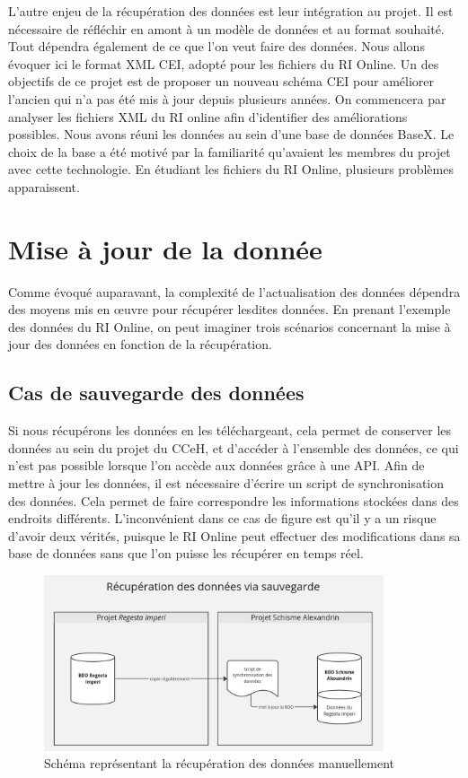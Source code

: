 L’autre enjeu de la récupération des données est leur intégration au projet. Il est nécessaire de réfléchir en amont à un modèle de données et au format souhaité. Tout dépendra également de ce que l’on veut faire des données. Nous allons évoquer ici le format XML CEI, adopté pour les fichiers du RI Online. 
Un des objectifs de ce projet est de proposer un nouveau schéma CEI pour améliorer l’ancien qui n’a pas été mis à jour depuis plusieurs années. On commencera par analyser les fichiers XML du RI online afin d’identifier des améliorations possibles. Nous avons réuni les données au sein d’une base de données BaseX. Le choix de la base a été motivé par la familiarité qu’avaient les membres du projet avec cette technologie. En étudiant les fichiers du RI Online, plusieurs problèmes apparaissent.



    \section{Mise à jour de la donnée}

Comme évoqué auparavant, la complexité de l’actualisation des données dépendra des moyens mis en œuvre pour récupérer lesdites données. En prenant l'exemple des données du RI Online, on peut imaginer trois scénarios concernant la mise à jour des données en fonction de la récupération. 

    \subsection{Cas de sauvegarde des données}

Si nous récupérons les données en les téléchargeant, cela permet de conserver les données au sein du projet du CCeH, et d'accéder à l'ensemble des données, ce qui n'est pas possible lorsque l'on accède aux données grâce à une API.
Afin de mettre à jour les données, il est nécessaire d'écrire un script de synchronisation des données. Cela permet de faire correspondre les informations stockées dans des endroits différents. L'inconvénient dans ce cas de figure est qu'il y a un risque d'avoir deux vérités, puisque le RI Online peut effectuer des modifications dans sa base de données sans que l'on puisse les récupérer en temps réel.\\ 

\begin{figure}[H]
    \centering
    \includegraphics[width=10cm]{images/recup-donnees-sauvegarde.jpg}
    \caption{Schéma représentant la récupération des données manuellement}
    \label{fig:schemadonneessauvegarde}
\end{figure}


